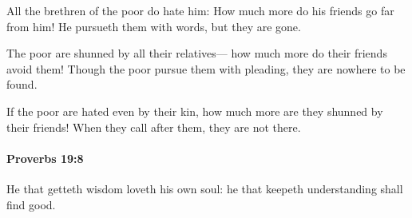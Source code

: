 			\begin{versebox}
					\item[BHS] 
					\item[ASV] All the brethren of the poor do hate him: How much more do his friends go far from him! He pursueth them with words, but they are gone.
					\item[NIV] The poor are shunned by all their relatives— how much more do their friends avoid them! Though the poor pursue them with pleading, they are nowhere to be found.
					\item[NRSV] If the poor are hated even by their kin, how much more are they shunned by their friends! When they call after them, they are not there.
			\end{versebox}

		\paragraph{Proverbs 19:8} %
			\label{PROVERBS-19-8}

			He that getteth wisdom loveth his own soul: he that keepeth understanding shall find good.

